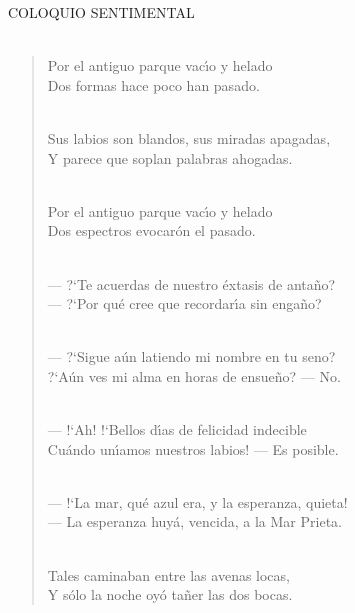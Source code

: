
\hspace*{25mm} \hspace*{15mm} COLOQUIO SENTIMENTAL \\ \\

\begin{verse}
\hspace*{25mm} Por el antiguo parque vac\'{\i}o y helado \\
\hspace*{25mm} Dos formas hace poco han pasado. \\ \

\hspace*{25mm} Sus labios son blandos, sus miradas apagadas, \\
\hspace*{25mm} Y parece que soplan palabras ahogadas. \\ \

\hspace*{25mm} Por el antiguo parque vac\'{\i}o y helado \\
\hspace*{25mm} Dos espectros evocar\'on el pasado. \\ \

\hspace*{25mm} --- ?`Te acuerdas de nuestro \'extasis de anta\~no? \\
\hspace*{25mm} --- ?`Por qu\'e cree que recordar\'{\i}a sin enga\~no? \\ \

\hspace*{25mm} --- ?`Sigue a\'un latiendo mi nombre en tu seno? \\
\hspace*{25mm} ?`A\'un ves mi alma en horas de ensue\~no? --- No. \\ \

\hspace*{25mm} --- !`Ah! !`Bellos d\'{\i}as de felicidad indecible \\
\hspace*{25mm} Cu\'ando un\'{\i}amos nuestros labios! --- Es posible. \\ \

\hspace*{25mm} --- !`La mar, qu\'e azul era, y la esperanza, quieta! \\
\hspace*{25mm} --- La esperanza huy\'a, vencida, a la Mar Prieta. \\ \

\hspace*{25mm} Tales caminaban entre las avenas locas, \\
\hspace*{25mm} Y s\'olo la noche oy\'o ta\~ner las dos bocas. \\
\end{verse}

